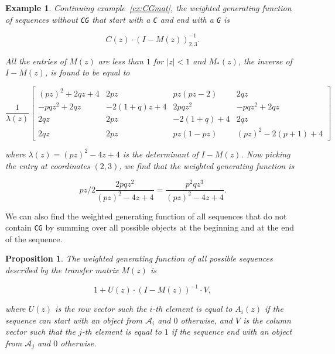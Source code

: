 \documentclass{article}
\newtheorem{example}{Example}
\newtheorem{proposition}{Proposition}
\begin{document}
\begin{example}
\label{ex:CGmat2}
Continuing example~\ref{ex:CGmat}, the weighted generating function of
sequences without \texttt{CG} that start with a \texttt{C} and end with a
\texttt{G} is

\begin{equation*}
C(z) \cdot (I-M(z))^{-1}_{2,3}.
\end{equation*}

All the entries of $M(z)$ are less than $1$ for $|z| < 1$ and $M_*(z)$,
the inverse of $I-M(z)$, is found to be equal to 

\begin{equation*}
\frac{1}{\lambda(z)} \left[
\begin{matrix}
(pz)^2+2qz+4   & 2pz        & pz(pz-2)   & 2qz                \\
-pqz^2+2qz     & -2(1+q)z+4 & 2pqz^2     & -pqz^2+2qz         \\
2qz            & 2pz        & -2(1+q)+4  & 2qz                \\
2qz            & 2pz        & pz(1-pz)   & (pz)^2 - 2(p+1) +4
\end{matrix}
\right]
\end{equation*}

\noindent
where $\lambda(z) = (pz)^2 - 4z + 4$ is the determinant of $I-M(z)$. Now
picking the entry at coordinates $(2,3)$, we find that the weighted
generating function is

\begin{equation*}
pz/2\frac{2pqz^2}{(pz)^2 - 4z + 4}
= \frac{p^2qz^3}{(pz)^2 - 4z + 4}.
\end{equation*}
\end{example}

We can also find the weighted generating function of all sequences that do
not contain \texttt{CG} by summing over all possible objects at the
beginning and at the end of the sequence.

\begin{proposition}
\label{th:TM2WGF}
The weighted generating function of all possible sequences described by
the transfer matrix $M(z)$ is 

\begin{equation}
1 + U(z) \cdot (I-M(z))^{-1} \cdot V,
\end{equation}

\noindent
where $U(z)$ is the row vector such the $i$-th element is equal to
$A_i(z)$ if the sequence can start with an object from $\mathcal{A}_i$ and
$0$ otherwise, and $V$ is the column vector such that the $j$-th element
is equal to $1$ if the sequence end with an object from $\mathcal{A}_j$
and $0$ otherwise.
\end{proposition}
\end{document}
